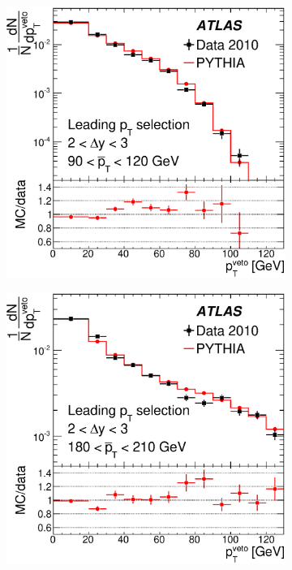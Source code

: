 \begin{figure}
\centering
        \begin{subfigure}[b]{0.5\textwidth}
                \centering
                \includegraphics[width=\textwidth]{figures/GBJ1/UncorrectedData/Pt3_dY_2_3_pt_90_120_PYTHIA.eps}
        \end{subfigure}%
        \begin{subfigure}[b]{0.5\textwidth}
                \centering
                \includegraphics[width=\textwidth]{figures/GBJ1/UncorrectedData/Pt3_dY_2_3_pt_180_210_PYTHIA.eps}

\end{subfigure}
\end{figure}

